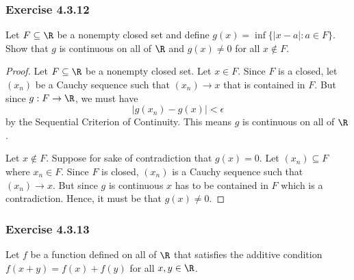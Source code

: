 \subsubsection{Exercise 4.3.12} Let \( F \subseteq \R  \) be a nonempty closed set and define \( g(x) = \inf \{ | x - a  | : a \in  F  \}  \). Show that \( g \) is continuous on all of \( \R  \) and \( g(x) \neq  0 \) for all \( x \notin F  \).
\begin{proof}
Let \( F \subseteq \R  \) be a nonempty closed set. Let \( x \in F  \). Since \( F \) is a closed, let \( (x_n)  \) be a Cauchy sequence such that \( (x_n) \to x  \) that is contained in \( F \). But since \( g: F \to \R  \), we must have 
\[ | g(x_n) - g(x) | < \epsilon \]
by the Sequential Criterion of Continuity. This means \( g \) is continuous on all of \( \R  \).

Let \( x \notin F  \). Suppose for sake of contradiction that \( g(x) = 0  \). Let \( (x_n) \subseteq F  \) where \( x_n \in F  \). Since \( F  \) is closed, \( (x_n) \) is a Cauchy sequence such that \( (x_n) \to x  \). But since \( g \) is continuous \( x  \) has to be contained in \( F  \) which is a contradiction. Hence, it must be that \( g(x) \neq 0  \).
\end{proof}









\subsubsection{Exercise 4.3.13} Let \( f \) be a function defined on all of \( \R  \) that satisfies the additive condition \( f(x+y) = f(x) + f(y) \) for all \( x,y \in \R  \).

